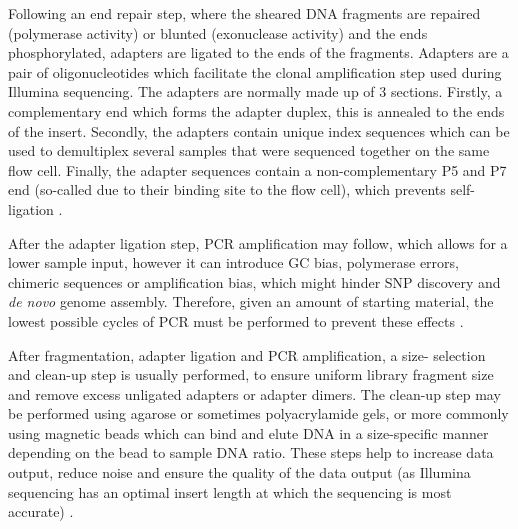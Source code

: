 Following an end repair step, where the sheared DNA fragments are repaired (polymerase activity) or blunted (exonuclease activity) and the ends phosphorylated, adapters are ligated to the ends of the fragments. Adapters are a pair of oligonucleotides which facilitate the clonal amplification step used during Illumina sequencing. The adapters are normally made up of 3 sections. Firstly, a complementary end which forms the adapter duplex, this is annealed to the ends of the insert. Secondly, the adapters contain unique index sequences which can be used to demultiplex several samples that were sequenced together on the same flow cell. Finally, the adapter sequences contain a non-complementary P5 and P7 end (so-called due to their binding site to the flow cell), which prevents self-ligation \cite{RN312,RN317}. 

After the adapter ligation step, PCR amplification may follow, which allows for a lower sample input, however it can introduce GC bias, polymerase errors, chimeric sequences or amplification bias, which might hinder SNP discovery and \textit{de novo} genome assembly. Therefore, given an amount of starting material, the lowest possible cycles of PCR must be performed to prevent these effects \cite{RN312,RN317}.

After fragmentation, adapter ligation and PCR amplification, a size- selection and clean-up step is usually performed, to ensure uniform library fragment size and remove excess unligated adapters or adapter dimers. The clean-up step may be performed using agarose or sometimes polyacrylamide gels, or more commonly using magnetic beads which can bind and elute DNA in a size-specific manner depending on the bead to sample DNA ratio. These steps help to increase data output, reduce noise and ensure the quality of the data output (as Illumina sequencing has an optimal insert length at which the sequencing is most accurate) \cite{RN312,RN317}.

